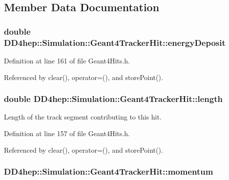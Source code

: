 \subsection{Member Data Documentation}
\hypertarget{class_d_d4hep_1_1_simulation_1_1_geant4_tracker_hit_a0af1fbbb8d345344c088b8596b97998f}{
\subsubsection[{energyDeposit}]{\setlength{\rightskip}{0pt plus 5cm}double {\bf DD4hep::Simulation::Geant4TrackerHit::energyDeposit}}}
\label{class_d_d4hep_1_1_simulation_1_1_geant4_tracker_hit_a0af1fbbb8d345344c088b8596b97998f}


Definition at line 161 of file Geant4Hits.h.

Referenced by clear(), operator=(), and storePoint().\hypertarget{class_d_d4hep_1_1_simulation_1_1_geant4_tracker_hit_a71b52bb59bc3f9a54d50c925f92027a5}{
\subsubsection[{length}]{\setlength{\rightskip}{0pt plus 5cm}double {\bf DD4hep::Simulation::Geant4TrackerHit::length}}}
\label{class_d_d4hep_1_1_simulation_1_1_geant4_tracker_hit_a71b52bb59bc3f9a54d50c925f92027a5}


Length of the track segment contributing to this hit. 

Definition at line 157 of file Geant4Hits.h.

Referenced by clear(), operator=(), and storePoint().\hypertarget{class_d_d4hep_1_1_simulation_1_1_geant4_tracker_hit_a134e45be8162d17fc85e1a0c5f8b7e52}{
\subsubsection[{momentum}]{ {\bf DD4hep::Simulation::Geant4TrackerHit::momentum}}}
\label{class_d_d4hep_1_1_simulation_1_1_geant4_tracker_hit_a134e45be8162d17fc85e1a0c5f8b7e52}


